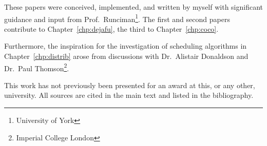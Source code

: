 These papers were conceived, implemented, and written by myself with significant guidance and input
from Prof.~Runciman\footnote{University of York}.  The first and second papers contribute to
Chapter~\ref{chp:dejafu}, the third to Chapter~\ref{chp:coco}.

Furthermore, the inspiration for the investigation of scheduling algorithms in
Chapter~\ref{chp:distrib} arose from discussions with Dr.~Alistair Donaldson and Dr.~Paul
Thomson\footnote{Imperial College London}.

This work has not previously been presented for an award at this, or any other, university.  All
sources are cited in the main text and listed in the bibliography.
